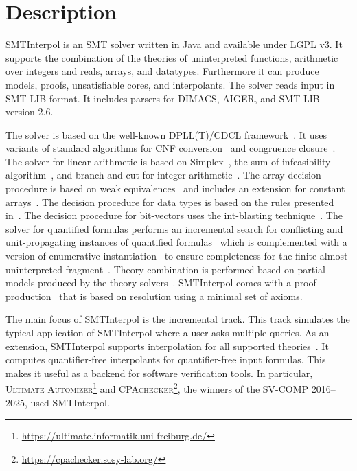 \documentclass[a4paper]{easychair}
\title{\SI\\{\large Version \version}}
\author{Jochen Hoenicke\inst{1}}
\institute{
  Certora, \email{jochen@certora.com}
}
\newcommand\SI{SMTInterpol\xspace}
\begin{document}
\maketitle
\section*{Description}
\SI is an SMT solver written in Java and available under LGPL v3.
It supports the combination of the theories of uninterpreted functions, arithmetic over integers and reals, arrays, and datatypes.
Furthermore it can produce models, proofs, unsatisfiable cores, and interpolants.
The solver reads input in SMT-LIB format.
It includes parsers for DIMACS, AIGER, and SMT-LIB version 2.6.

The solver is based on the well-known DPLL(T)/CDCL framework~\cite{DBLP:conf/cav/GanzingerHNOT04}.
It uses variants of standard algorithms for CNF conversion~\cite{DBLP:journals/jsc/PlaistedG86} and congruence closure~\cite{DBLP:conf/rta/NieuwenhuisO05}.
The solver for linear arithmetic is based on Simplex~\cite{DBLP:conf/cav/DutertreM06}, the sum-of-infeasibility algorithm~\cite{DBLP:conf/fmcad/KingBD13}, and branch-and-cut for integer arithmetic~\cite{DBLP:conf/cav/ChristH15,DBLP:conf/cav/DilligDA09}.
The array decision procedure is based on weak equivalences~\cite{DBLP:conf/frocos/ChristH15} and includes an extension for constant arrays~\cite{DBLP:conf/vmcai/HoenickeS19}.
The decision procedure for data types is based on the rules presented in~\cite{DBLP:journals/jsat/BarrettST07}.
The decision procedure for bit-vectors uses the int-blasting technique~\cite{DBLP:conf/vmcai/ZoharIMNNPRBT22,DBLP:conf/smt/BarthH24}.
The solver for quantified formulas performs an incremental search for conflicting and unit-propagating instances of quantified formulas~\cite{DBLP:conf/vmcai/HoenickeS21} which is complemented with a version of enumerative instantiation~\cite{DBLP:conf/tacas/ReynoldsBF18} to ensure completeness for the finite almost uninterpreted fragment~\cite{DBLP:conf/cav/GeM09}.
Theory combination is performed based on partial models produced by the theory solvers~\cite{DBLP:journals/entcs/MouraB08}.
\SI comes with a proof production~\cite{DBLP:conf/smt/HoenickeS22} that is based on resolution using a minimal set of axioms.

The main focus of \SI is the incremental track.
This track simulates the typical application of \SI where a user asks multiple queries.
As an extension, \SI supports interpolation for all supported theories~\cite{DBLP:journals/jar/ChristH16,DBLP:conf/cade/HoenickeS18,DBLP:conf/vmcai/HoenickeS19,DBLP:conf/smt/HenkelHS21}.  It computes quantifier-free interpolants for quantifier-free input formulas.
This makes it useful as a backend for software verification tools.
In particular, \textsc{Ultimate Automizer}\footnote{\url{https://ultimate.informatik.uni-freiburg.de/}} and \textsc{CPAchecker}\footnote{\url{https://cpachecker.sosy-lab.org/}}, the winners of the SV-COMP 2016--2025, used \SI.
\end{document}
